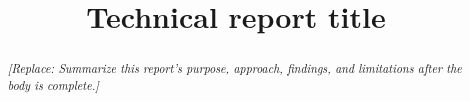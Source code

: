 \documentclass[conference]{IEEEtran}
\title{Technical report title}
\author{\IEEEauthorblockN{Author name}
\IEEEauthorblockA{Department or affiliation}}
\newcommand{\placeholder}[1]{\textit{[Replace: #1]}}
\begin{document}
\maketitle
\begin{abstract}
\placeholder{Summarize this report's purpose, approach, findings, and limitations after the body is complete.}
\end{abstract}

% 
% 
\end{document}
